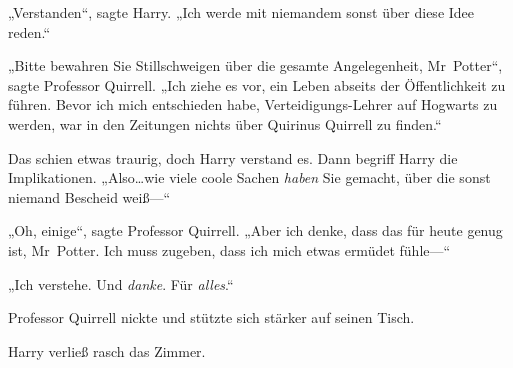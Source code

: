 „Verstanden“, sagte Harry. „Ich werde mit niemandem sonst über diese Idee reden.“

„Bitte bewahren Sie Stillschweigen über die gesamte Angelegenheit, Mr~Potter“, sagte Professor Quirrell. „Ich ziehe es vor, ein Leben abseits der Öffentlichkeit zu führen. Bevor ich mich entschieden habe, Verteidigungs-Lehrer auf Hogwarts zu werden, war in den Zeitungen nichts über Quirinus Quirrell zu finden.“

Das schien etwas traurig, doch Harry verstand es. Dann begriff Harry die Implikationen. „Also…wie viele coole Sachen \emph{haben} Sie gemacht, über die sonst niemand Bescheid weiß—“

„Oh, einige“, sagte Professor Quirrell. „Aber ich denke, dass das für heute genug ist, Mr~Potter. Ich muss zugeben, dass ich mich etwas ermüdet fühle—“

„Ich verstehe. Und \emph{danke}. Für \emph{alles}.“

Professor Quirrell nickte und stützte sich stärker auf seinen Tisch.

Harry verließ rasch das Zimmer.

